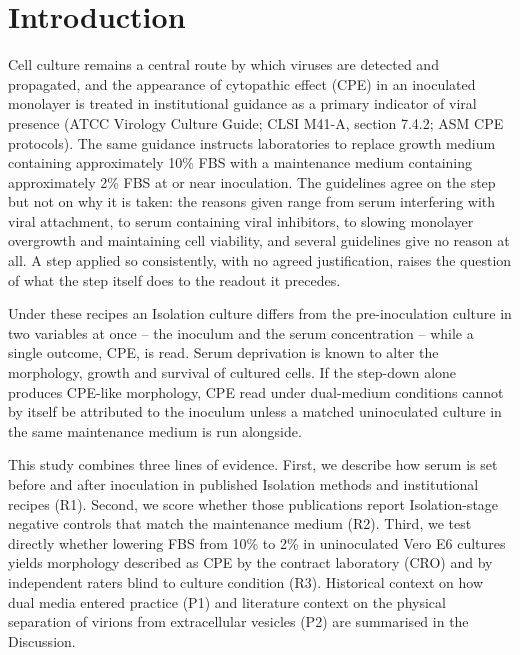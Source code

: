 \section*{Introduction}
Cell culture remains a central route by which viruses are detected and propagated, and the appearance of cytopathic effect (CPE) in an inoculated monolayer is treated in institutional guidance as a primary indicator of viral presence (ATCC Virology Culture Guide; CLSI M41-A, section 7.4.2; ASM CPE protocols). The same guidance instructs laboratories to replace growth medium containing approximately 10\% FBS with a maintenance medium containing approximately 2\% FBS at or near inoculation. The guidelines agree on the step but not on why it is taken: the reasons given range from serum interfering with viral attachment, to serum containing viral inhibitors, to slowing monolayer overgrowth and maintaining cell viability, and several guidelines give no reason at all. A step applied so consistently, with no agreed justification, raises the question of what the step itself does to the readout it precedes.

Under these recipes an Isolation culture differs from the pre-inoculation culture in two variables at once -- the inoculum and the serum concentration -- while a single outcome, CPE, is read. Serum deprivation is known to alter the morphology, growth and survival of cultured cells. If the step-down alone produces CPE-like morphology, CPE read under dual-medium conditions cannot by itself be attributed to the inoculum unless a matched uninoculated culture in the same maintenance medium is run alongside.


This study combines three lines of evidence. First, we describe how serum is set before and after inoculation in published Isolation methods and institutional recipes (R1). Second, we score whether those publications report Isolation-stage negative controls that match the maintenance medium (R2). Third, we test directly whether lowering FBS from 10\% to 2\% in uninoculated Vero E6 cultures yields morphology described as CPE by the contract laboratory (CRO) and by independent raters blind to culture condition (R3). Historical context on how dual media entered practice (P1) and literature context on the physical separation of virions from extracellular vesicles (P2) are summarised in the Discussion. 
